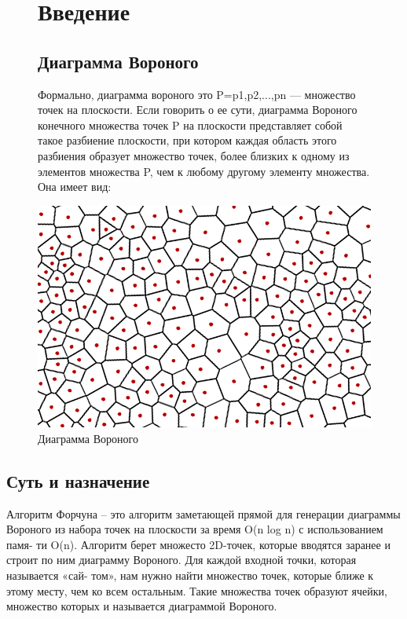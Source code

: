 \documentclass[ a4paper]{article}
\begin{document}
    \tableofcontents 
\newpage
\begin{figure}
\section{Введение}

\subsection{Диаграмма Вороного}
Формально, диаграмма вороного это P={p1,p2,...,pn} — множество точек на плоскости.
Если говорить о ее сути, диаграмма Вороного конечного множества точек P на плоскости представляет собой такое разбиение плоскости, при котором каждая область этого разбиения образует множество точек, более близких к одному из элементов множества P, чем к любому другому элементу множества. 
Она имеет вид:

\centering
\includegraphics[scale = 0.4]{voronoi}
\caption{\label{tab:widgets}Диаграмма Вороного}
\end{figure}

\subsection{Суть и назначение}
Алгоритм Форчуна – это алгоритм заметающей прямой для генерации диаграммы
Вороного из набора точек на плоскости за время O(n log n) с использованием памя-
ти O(n). Алгоритм берет множесто 2D-точек, которые вводятся заранее и строит по
ним диаграмму Вороного. Для каждой входной точки, которая называется «сай-
том», нам нужно найти множество точек, которые ближе к этому месту, чем ко
всем остальным. Такие множества точек образуют ячейки, множество которых и
называется диаграммой Вороного.
\end{document}
